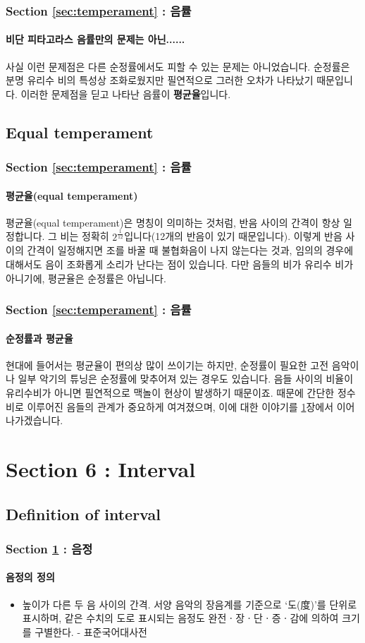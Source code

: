 \documentclass{beamer}
\begin{document}
	\begin{frame}
		\frametitle{Section \ref{sec:temperament} : 음률}
		\framesubtitle{비단 피타고라스 음률만의 문제는 아닌......}
		사실 이런 문제점은 다른 순정률에서도 피할 수 있는 문제는 아니었습니다. 순정률은 분명 유리수 비의 특성상 조화로웠지만 필연적으로 그러한 오차가 나타났기 때문입니다. 이러한 문제점을 딛고 나타난 음률이 {\bf 평균율}입니다.
	\end{frame}
	
	\subsection{Equal temperament}
	\begin{frame}
		\frametitle{Section \ref{sec:temperament} : 음률}
		\framesubtitle{평균율(equal temperament)}
		평균율(equal temperament)은 명칭이 의미하는 것처럼, 반음 사이의 간격이 항상 일정합니다. 그 비는 정확히 $ 2^\frac{1}{12} $입니다(12개의 반음이 있기 때문입니다). 이렇게 반음 사이의 간격이 일정해지면 조를 바꿀 때 불협화음이 나지 않는다는 것과, 임의의 경우에 대해서도 음이 조화롭게 소리가 난다는 점이 있습니다. 다만 음들의 비가 유리수 비가 아니기에, 평균율은 순정률은 아닙니다.
	\end{frame}
	
	\begin{frame}
		\frametitle{Section \ref{sec:temperament} : 음률}
		\framesubtitle{순정률과 평균율}
		현대에 들어서는 평균율이 편의상 많이 쓰이기는 하지만, 순정률이 필요한 고전 음악이나 일부 악기의 튜닝은 순정률에 맞추어져 있는 경우도 있습니다. 음들 사이의 비율이 유리수비가 아니면 필연적으로 맥놀이 현상이 발생하기 때문이죠. 때문에 간단한 정수비로 이루어진 음들의 관계가 중요하게 여겨졌으며, 이에 대한 이야기를 \ref{sec:interval}장에서 이어나가겠습니다.
	\end{frame}
	
	\section{Section 6 : Interval}\label{sec:interval}
	\subsection{Definition of interval}
	\begin{frame}
		\frametitle{Section \ref{sec:interval} : 음정}
		\framesubtitle{음정의 정의}
		\begin{definition}[음정, 音程, Interval]
			\begin{itemize}
				\item 높이가 다른 두 음 사이의 간격. 서양 음악의 장음계를 기준으로 ‘도(度)’를 단위로 표시하며, 같은 수치의 도로 표시되는 음정도 완전ㆍ장ㆍ단ㆍ증ㆍ감에 의하여 크기를 구별한다. - 표준국어대사전
			\end{itemize}
		\end{definition}
	\end{frame}
	
\end{document}
